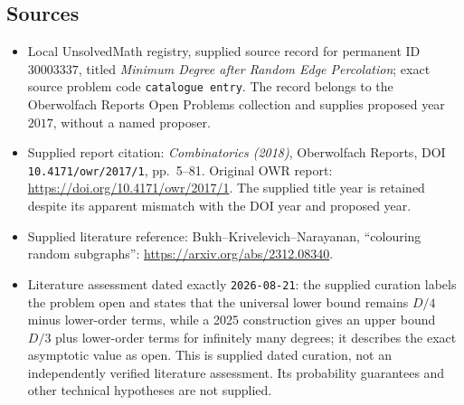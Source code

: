 \documentclass[11pt]{article}
\begin{document}
\subsection{Sources}
\begin{itemize}
\item Local UnsolvedMath registry, supplied source record for permanent ID \(30003337\), titled \emph{Minimum Degree after Random Edge Percolation}; exact source problem code \texttt{catalogue entry}. The record belongs to the Oberwolfach Reports Open Problems collection and supplies proposed year \(2017\), without a named proposer.
\item Supplied report citation: \emph{Combinatorics (2018)}, Oberwolfach Reports, DOI \texttt{10.4171/owr/2017/1}, pp.\ 5--81. Original OWR report: \url{https://doi.org/10.4171/owr/2017/1}. The supplied title year is retained despite its apparent mismatch with the DOI year and proposed year.
\item Supplied literature reference: Bukh--Krivelevich--Narayanan, ``colouring random subgraphs'': \url{https://arxiv.org/abs/2312.08340}.
\item Literature assessment dated exactly \texttt{2026-08-21}: the supplied curation labels the problem open and states that the universal lower bound remains \(D/4\) minus lower-order terms, while a 2025 construction gives an upper bound \(D/3\) plus lower-order terms for infinitely many degrees; it describes the exact asymptotic value as open. This is supplied dated curation, not an independently verified literature assessment. Its probability guarantees and other technical hypotheses are not supplied.
\end{itemize}
\end{document}
